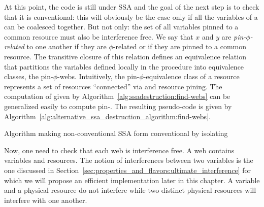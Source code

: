 At this point, the code is still under SSA and the goal of the next step is to check that it is conventional: this will obviously be the case only if all the variables of a \phiweb can be coalesced together. But not only: the set of all variables pinned to a common resource must also be interference free. 
We say that $x$ and $y$ are \emph{pin-$\phi$-related} to one another if they are $\phi$-related or if they are pinned to a common resource. The transitive closure of this relation defines an equivalence relation that 
partitions the variables defined locally in the procedure into equivalence classes, the pin-$\phi$-webs.
Intuitively, the pin-$\phi$-equivalence class of a resource represents a set of resources ``connected'' via \phifuns and resource pining.
The computation of \phiwebs given by Algorithm~\ref{alg:ssadestruction:find-webs} can be generalized easily to compute pin-\phiwebs. The resulting pseudo-code is given by Algorithm~\ref{alg:alternative_ssa_destruction_algorithm:find-webs}. 

\begin{algorithm}[h]
 \caption{\label{alg:alternative_ssa_destruction:sreedhar}Algorithm making non-conventional SSA form conventional by isolating \phinodes}
\end{algorithm}


Now, one need to check that each web is interference free. A web contains variables and resources. The notion of interferences between two variables is the one discussed in Section~\ref{sec:properties_and_flavors:ultimate_interference} for which we will propose an efficient implementation later in this chapter. A variable and a physical resource do not interfere while two distinct physical resources will interfere with one another.

